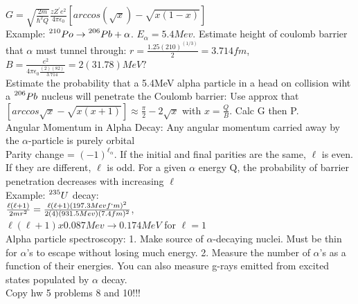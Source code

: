 \documentclass{article}
\begin{document}
\begin{multicols}{3}
$G = \sqrt{\frac{2m}{\hbar^{2}Q}}\frac{zZ^{\prime}e^{2}}{4\pi\epsilon_{0}}[arccos(\sqrt{x}) - \sqrt{x(1-x)}]$\\
Example: $\prescript{210}{}{Po} \rightarrow \prescript{206}{}{Pb} + \alpha$.  $E_{\alpha} = 5.4Mev$. Estimate height of coulomb barrier that $\alpha$ must tunnel through:  $r = \frac{1.25(210)^(1/3)}{2} = 3.714 fm$,\\ $B = \frac{e^{2}}{4\pi\epsilon_{0} \frac{(2)(82)}{3.714}} = 2(31.78)MeV?$\\
Estimate the probability that a 5.4MeV alpha particle in a head on collision wiht a $\prescript{206}{}{Pb}$ nucleus will penetrate the Coulomb barrier:  Use approx that $[arccos\sqrt{x} - \sqrt{x(x+1)}] \approx \frac{\pi}{2} - 2\sqrt{x}$ with $x = \frac{Q}{B}$.  Calc G then P.\\
Angular Momentum in Alpha Decay: Any angular momentum carried away by the $\alpha$-particle is purely orbital\\
Parity change = $(-1)^{\ell_{\alpha}}$.  If the initial and final parities are the same, $\ell$ is even.  If they are different, $\ell$ is odd.  For a given $\alpha$ energy Q, the probability of barrier penetration decreases with increasing $\ell$\\
Example: $\prescript{235}{}{U}$ decay:\\
 $\frac{\ell(\ell+1)}{2mr^{2}} = \frac{\ell(\ell+1)(197.3Mev f`m)^{2}}{2(4)(931.5Mev)(7.4fm)^{2}}$,\\ $\ell(\ell+1)x0.087Mev \rightarrow 0.174MeV$ for $\ell = 1$\\
 Alpha particle spectroscopy: 1. Make source of $\alpha$-decaying nuclei.  Must be thin for $\alpha$'s to escape without losing much energy.  2. Measure the number of $\alpha$'s as a function of their energies.  You can also measure g-rays emitted from excited states populated by $\alpha$ decay.\\

Copy hw 5 problems 8 and 10!!!\\


\end{multicols}
\end{document}

